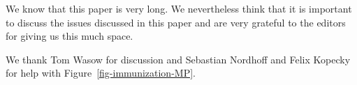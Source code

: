 \documentclass[output=paper]{langsci/langscibook}
\begin{document}
We know that this paper is very long. We nevertheless think that it is important to discuss the
issues discussed in this paper and are very grateful to the editors for giving us this much space.

We thank Tom Wasow for discussion and Sebastian Nordhoff and Felix Kopecky for help with Figure~\ref{fig-immunization-MP}.














\end{document}
